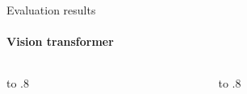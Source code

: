 \documentclass[aspectratio=169]{beamer}
\begin{document}
\begin{frame}{Evaluation results}
\framesubtitle{Vision transformer}
\begin{columns}[T]
    \begin{column}{0.8\textwidth}\vbox to .8\end{column}
    \begin{column}{0.2\textwidth}\vbox to .8\end{column}
    \end{columns}
\end{frame}
\end{document}
